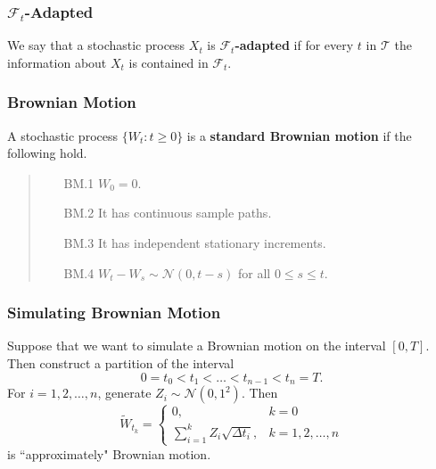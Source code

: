 \documentclass{beamer}
\begin{document}
\begin{frame}

\frametitle{$\mathcal{F}_t$-Adapted}
\begin{Definition}
We say that a stochastic process $X_t$ is $\mathcal{F}_t${\bf-adapted} if for every $t$ in $\mathcal{T}$ the information about $X_t$ is contained in $\mathcal{F}_t$.
\end{Definition}
\end{frame}

\begin{frame}
\frametitle{Brownian Motion}
\begin{Definition}
A stochastic process $\{W_t : t\geq 0\}$ is a {\bf standard Brownian motion} if the following hold.
\medskip

\begin{quote}
\begin{enumerate}
\item[BM.1] $W_0 = 0$.
\item[BM.2] It has continuous sample paths.
\item[BM.3] It has independent stationary increments.
\item[BM.4] $W_t - W_s \sim{\mathcal{N}(0, t - s)}$ for all $0\leq s \leq t$.
\end{enumerate}
\end{quote}
\end{Definition}
\end{frame}

\begin{frame}
\frametitle{Simulating Brownian Motion}
Suppose that we want to simulate a Brownian motion on the interval $[0, T]$. Then construct a partition of the interval
$$
0 = t_0 < t_1 <\ldots < t_{n - 1} < t_n = T.
$$
For $i = 1, 2,\ldots, n$, generate $Z_i\sim{\mathcal{N}(0, 1^2)}$. Then 
$$
\widetilde{W}_{t_k} = \begin{cases} 0	,	&	k = 0\\
						\sum_{i = 1}^k Z_i \sqrt{\Delta t_i},	&	k = 1, 2,\ldots, n
						\end{cases}
$$
is ``approximately" Brownian motion.
\end{frame}
\end{document}
